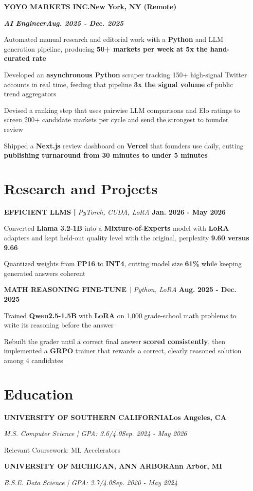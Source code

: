 \documentclass[10pt]{article}
\renewcommand{\note}[1]{#1\par}
\newcommand{\job}[4]{%
  \vspace{0pt}%
  \textbf{\MakeUppercase{#1}}\hfill\textbf{#2}\par
  \vspace{0.5pt}%
  \textbf{\textit{#3}}\hfill\textbf{\textit{#4}}\par
}
\newcommand{\school}[4]{%
  \vspace{2pt}%
  \textbf{\MakeUppercase{#1}}\hfill\textbf{#2}\par
  \vspace{0.5pt}%
  \textit{#3}\hfill\textit{#4}\par
}
\newcommand{\proj}[4]{%
  \vspace{3pt}%
  \textbf{\MakeUppercase{#1} | }\textit{#2}\hfill
  \textbf{#4}%
  \notblank{#3}{\ \textbf{| #3}}{}%
  \par
}
\begin{document}
\vspace{3pt}
\job{Yoyo Markets Inc.}{New York, NY (Remote)}{AI Engineer}{Aug. 2025 - Dec. 2025}
\begin{bullets}
  \item Automated manual research and editorial work with a \textbf{Python} and LLM generation pipeline, producing \textbf{50+ markets per week at 5x the hand-curated rate}
  \item Developed an \textbf{asynchronous Python} scraper tracking 150+ high-signal Twitter accounts in real time, feeding that pipeline \textbf{3x the signal volume} of public trend aggregators
  \item Devised a ranking step that uses pairwise LLM comparisons and Elo ratings to screen 200+ candidate markets per cycle and send the strongest to founder review
  \item Shipped a \textbf{Next.js} review dashboard on \textbf{Vercel} that founders use daily, cutting \textbf{publishing turnaround from 30 minutes to under 5 minutes}
\end{bullets}

\section{Research and Projects}
\vspace{-3pt}
\proj{Efficient LLMs}{PyTorch, CUDA, LoRA}{USC}{Jan. 2026 - May 2026}
\begin{bullets}
  \item Converted \textbf{Llama 3.2-1B} into a \textbf{Mixture-of-Experts} model with \textbf{LoRA} adapters and kept held-out quality level with the original, perplexity \textbf{9.60 versus 9.66}
  \item Quantized weights from \textbf{FP16} to \textbf{INT4}, cutting model size \textbf{61\%} while keeping generated answers coherent
\end{bullets}

\proj{Math Reasoning Fine-Tune}{Python, LoRA}{USC}{Aug. 2025 - Dec. 2025}
\begin{bullets}
  \item Trained \textbf{Qwen2.5-1.5B} with \textbf{LoRA} on 1,000 grade-school math problems to write its reasoning before the answer
  \item Rebuilt the grader until a correct final answer \textbf{scored consistently}, then implemented a \textbf{GRPO} trainer that rewards a correct, clearly reasoned solution among 4 candidates
\end{bullets}

\section{Education}
\vspace{-2pt}
\school{University of Southern California}{Los Angeles, CA}{M.S. Computer Science | GPA: 3.6/4.0}{Sep. 2024 - May 2026}
\note{Relevant Coursework: ML Accelerators}

\school{University of Michigan, Ann Arbor}{Ann Arbor, MI}{B.S.E. Data Science | GPA: 3.7/4.0}{Sep. 2020 - May 2024}
\end{document}
